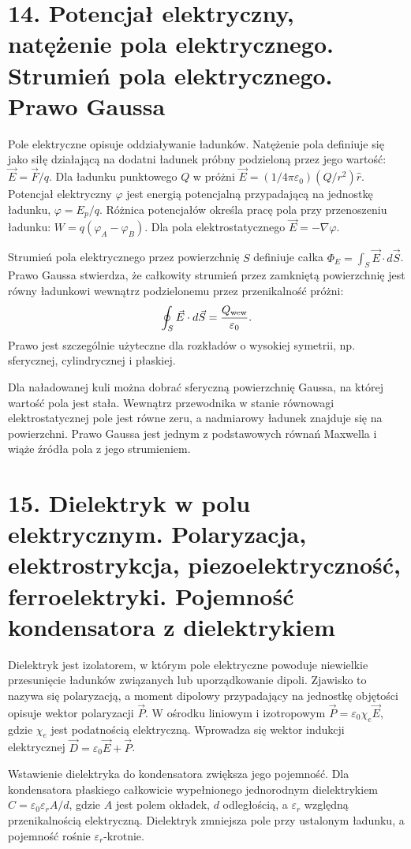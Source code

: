 \documentclass[11pt,a4paper,oneside]{report}
\begin{document}
\section{14. Potencjał elektryczny, natężenie pola elektrycznego. Strumień pola elektrycznego. Prawo Gaussa}
Pole elektryczne opisuje oddziaływanie ładunków. Natężenie pola definiuje się jako siłę działającą na dodatni ładunek próbny podzieloną przez jego wartość: \(\vec E=\vec F/q\). Dla ładunku punktowego \(Q\) w próżni \(\vec E=(1/4\pi\varepsilon_0)(Q/r^2)\hat r\). Potencjał elektryczny \(\varphi\) jest energią potencjalną przypadającą na jednostkę ładunku, \( \varphi=E_p/q\). Różnica potencjałów określa pracę pola przy przenoszeniu ładunku: \(W=q(\varphi_A-\varphi_B)\). Dla pola elektrostatycznego \(\vec E=-\nabla\varphi\).

Strumień pola elektrycznego przez powierzchnię \(S\) definiuje całka \(\Phi_E=\int_S\vec E\cdot d\vec S\). Prawo Gaussa stwierdza, że całkowity strumień przez zamkniętą powierzchnię jest równy ładunkowi wewnątrz podzielonemu przez przenikalność próżni:
\[
\oint_S\vec E\cdot d\vec S=\frac{Q_{\rm wew}}{\varepsilon_0}.
\]
Prawo jest szczególnie użyteczne dla rozkładów o wysokiej symetrii, np. sferycznej, cylindrycznej i płaskiej.

Dla naładowanej kuli można dobrać sferyczną powierzchnię Gaussa, na której wartość pola jest stała. Wewnątrz przewodnika w stanie równowagi elektrostatycznej pole jest równe zeru, a nadmiarowy ładunek znajduje się na powierzchni. Prawo Gaussa jest jednym z podstawowych równań Maxwella i wiąże źródła pola z jego strumieniem.

\section{15. Dielektryk w polu elektrycznym. Polaryzacja, elektrostrykcja, piezoelektryczność, ferroelektryki. Pojemność kondensatora z dielektrykiem}
Dielektryk jest izolatorem, w którym pole elektryczne powoduje niewielkie przesunięcie ładunków związanych lub uporządkowanie dipoli. Zjawisko to nazywa się polaryzacją, a moment dipolowy przypadający na jednostkę objętości opisuje wektor polaryzacji \(\vec P\). W ośrodku liniowym i izotropowym \(\vec P=\varepsilon_0\chi_e\vec E\), gdzie \(\chi_e\) jest podatnością elektryczną. Wprowadza się wektor indukcji elektrycznej \(\vec D=\varepsilon_0\vec E+\vec P\).

Wstawienie dielektryka do kondensatora zwiększa jego pojemność. Dla kondensatora płaskiego całkowicie wypełnionego jednorodnym dielektrykiem \(C=\varepsilon_0\varepsilon_r A/d\), gdzie \(A\) jest polem okładek, \(d\) odległością, a \(\varepsilon_r\) względną przenikalnością elektryczną. Dielektryk zmniejsza pole przy ustalonym ładunku, a pojemność rośnie \(\varepsilon_r\)-krotnie.
\end{document}
